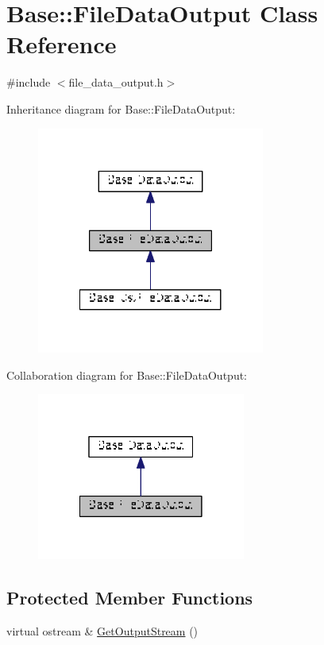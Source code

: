 \hypertarget{classBase_1_1FileDataOutput}{\section{Base\-:\-:File\-Data\-Output Class Reference}
\label{classBase_1_1FileDataOutput}
}


{\ttfamily \#include $<$file\-\_\-data\-\_\-output.\-h$>$}



Inheritance diagram for Base\-:\-:File\-Data\-Output\-:\nopagebreak
\begin{figure}[H]
\begin{center}
\leavevmode
\includegraphics[width=212pt]{classBase_1_1FileDataOutput__inherit__graph}
\end{center}
\end{figure}


Collaboration diagram for Base\-:\-:File\-Data\-Output\-:\nopagebreak
\begin{figure}[H]
\begin{center}
\leavevmode
\includegraphics[width=194pt]{classBase_1_1FileDataOutput__coll__graph}
\end{center}
\end{figure}
\subsection*{Protected Member Functions}
\begin{DoxyCompactItemize}
\item 
virtual ostream \& \hyperlink{classBase_1_1FileDataOutput_ae541a6775f2a1641b85e47f610618cd0}{Get\-Output\-Stream} ()
\end{DoxyCompactItemize}
